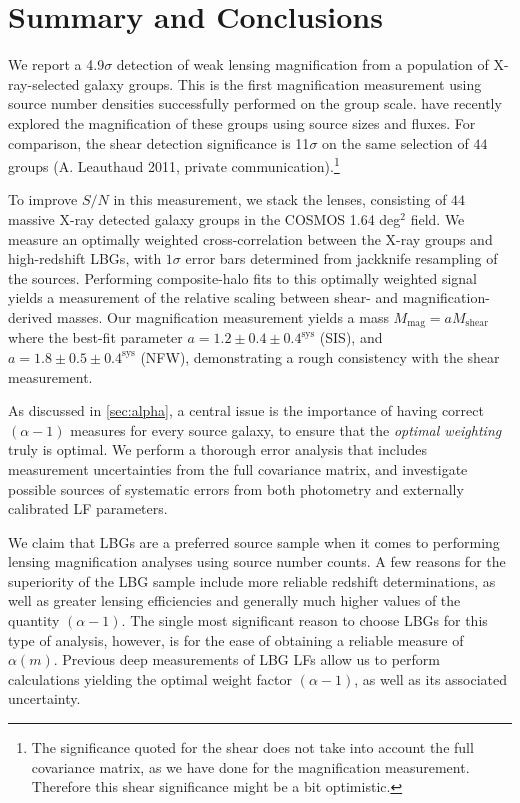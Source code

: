 \section{Summary and Conclusions}
\label{sec:summary2}
We report a 4.9$\sigma$ detection of weak lensing magnification from a population of X-ray-selected galaxy groups. This is the first magnification measurement using source number densities successfully performed on the group scale. \citet{Schmidt12} have recently explored the magnification of these groups using source sizes and fluxes. For comparison, the shear detection significance is 11$\sigma$ on the same selection of $44$ groups (A. Leauthaud 2011, private communication).\footnote{The significance quoted for the shear does not take into account the full covariance matrix, as we have done for the magnification measurement. Therefore this shear significance might be a bit optimistic.}

To improve $S/N$ in this measurement, we stack the lenses, consisting of $44$ massive X-ray detected galaxy groups in the \ac{COSMOS} 1.64 deg$^2$ field.  We measure an optimally weighted cross-correlation between the X-ray groups and high-redshift \ac{LBG}s, with $1 \sigma$ error bars determined from jackknife resampling of the sources. Performing composite-halo fits to this optimally weighted signal yields a measurement of the relative scaling between shear- and magnification-derived masses. Our magnification measurement yields a mass $M_{\text{mag}}=aM_{\text{shear}}$ where the best-fit parameter $a= 1.2 \pm 0.4 \pm 0.4^{\text{sys}}$ (\ac{SIS}), and $a= 1.8 \pm 0.5 \pm 0.4^{\text{sys}}$ (\ac{NFW}), demonstrating a rough consistency with the shear measurement.

As discussed in \autoref{sec:alpha}, a central issue is the importance of having correct $(\alpha-1)$ measures for every source galaxy, to ensure that the {\it optimal weighting} truly is optimal. We perform a thorough error analysis that includes measurement uncertainties from the full covariance matrix, and investigate possible sources of systematic errors from both photometry and externally calibrated \ac{LF} parameters.

We claim that \ac{LBG}s are a preferred source sample when it comes to performing lensing magnification analyses using source number counts.  A few reasons for the superiority of the \ac{LBG} sample include more reliable redshift determinations, as well as greater lensing efficiencies and generally much higher values of the quantity $(\alpha-1)$.  The single most significant reason to choose \ac{LBG}s for this type of analysis, however, is for the ease of obtaining a reliable measure of $\alpha(m)$.  Previous deep measurements of \ac{LBG} \ac{LF}s allow us to perform calculations yielding the optimal weight factor $(\alpha-1)$, as well as its associated uncertainty.

